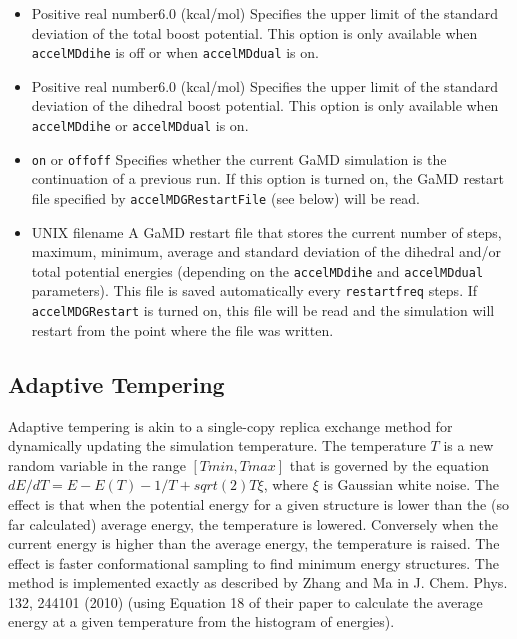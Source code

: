 \begin{itemize}
\item
{}
{Positive real number}{6.0 (kcal/mol)}
{Specifies the upper limit of the standard deviation of the total boost potential. This option is only available when {\tt accelMDdihe} is off or when {\tt accelMDdual} is on.
}

\item
{}
{Positive real number}{6.0 (kcal/mol)}
{Specifies the upper limit of the standard deviation of the dihedral boost potential. This option is only available when {\tt accelMDdihe} or {\tt accelMDdual} is on.
}

\item
{}
{{\tt on} or {\tt off}}{{\tt off}}
{Specifies whether the current GaMD simulation is the continuation of a previous run. If this option is turned on, the GaMD restart file specified by {\tt accelMDGRestartFile} (see below) will be read. 
}

\item
{}
{UNIX filename}
{A GaMD restart file that stores the current number of steps, maximum, minimum, average and standard deviation of the dihedral and/or total potential energies (depending on the {\tt accelMDdihe} and {\tt accelMDdual} parameters). This file is saved automatically every {\tt restartfreq} steps. If {\tt accelMDGRestart} is turned on, this file will be read and the simulation will restart from the point where the file was written.
}

\end{itemize}


\subsection{Adaptive Tempering}
\label{section:adapttemp}
Adaptive tempering is akin to a single-copy replica exchange method for dynamically updating the simulation temperature. The temperature $T$ is a new random variable in the range $[Tmin,Tmax]$ that is governed by the equation $dE/dT = E-E(T)-1/T+sqrt(2)T\xi$, where $\xi$ is Gaussian white noise. The effect is that when the potential energy for a given structure is lower than the (so far calculated) average energy, the temperature is lowered. Conversely when the current energy is higher than the average energy, the temperature is raised. The effect is faster conformational sampling to find minimum energy structures. The method is implemented exactly as described by Zhang and Ma in J. Chem. Phys. 132, 244101 (2010) (using Equation 18 of their paper to calculate the average energy at a given temperature from the histogram of energies). 

